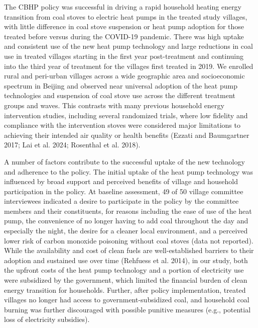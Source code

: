 \documentclass[
  letterpaper,
  DIV=11,
  numbers=noendperiod]{scrartcl}
\providecommand{\DIFadd}[1]{{\protect\color{blue}\uwave{#1}}} %
\providecommand{\DIFaddbegin}{} %
\providecommand{\DIFaddend}{} %
\providecommand{\DIFdelbegin}{} %
\providecommand{\DIFdelend}{} %
\newcommand{\DIFscaledelfig}{0.5}
\newlength{\DIFdelgraphicswidth} %
\newlength{\DIFdelgraphicsheight} %
\newcommand{\DIFaddincludegraphics}[2][]{{\color{blue}\fbox{\DIFOincludegraphics[#1]{#2}}}} %
\newcommand{\DIFdelincludegraphics}[2][]{%
\sbox{\DIFdelgraphicsbox}{\DIFOincludegraphics[#1]{#2}}%
\settoboxwidth{\DIFdelgraphicswidth}{\DIFdelgraphicsbox} %
\settoboxtotalheight{\DIFdelgraphicsheight}{\DIFdelgraphicsbox} %
\scalebox{\DIFscaledelfig}{%
\parbox[b]{\DIFdelgraphicswidth}{\usebox{\DIFdelgraphicsbox}\\[-\baselineskip] \rule{\DIFdelgraphicswidth}{0em}}\llap{\resizebox{\DIFdelgraphicswidth}{\DIFdelgraphicsheight}{%
\setlength{\unitlength}{\DIFdelgraphicswidth}%
\begin{picture}(1,1)%
\thicklines\linethickness{2pt} %
{\color[rgb]{1,0,0}\put(0,0){\framebox(1,1){}}}%
{\color[rgb]{1,0,0}\put(0,0){\line( 1,1){1}}}%
{\color[rgb]{1,0,0}\put(0,1){\line(1,-1){1}}}%
\end{picture}%
}\hspace*{3pt}}} %
} %
\DeclareRobustCommand{\DIFaddbegin}{\DIFOaddbegin \let\includegraphics\DIFaddincludegraphics} %
\DeclareRobustCommand{\DIFaddend}{\DIFOaddend \let\includegraphics\DIFOincludegraphics} %
\DeclareRobustCommand{\DIFdelbegin}{\DIFOdelbegin \let\includegraphics\DIFdelincludegraphics} %
\DeclareRobustCommand{\DIFdelend}{\DIFOaddend \let\includegraphics\DIFOincludegraphics} %
\begin{document}
The CBHP policy was successful in driving a rapid household heating
energy transition from coal stoves to electric heat pumps in the treated
study villages, with little difference in coal stove suspension or heat
pump adoption for those treated before versus during the COVID-19
pandemic. There was high uptake and consistent use of the new heat pump
technology and large reductions in coal use in treated villages starting
in the first year post-treatment and continuing into the third year of
treatment for the villages first treated in 2019. We enrolled rural and
peri-urban villages across a wide geographic area and socioeconomic
spectrum in Beijing and observed near universal adoption of the heat
pump technologies and suspension of coal stove use across the different
treatment groups and waves. This contrasts with many previous household
energy intervention studies, including several randomized trials, where
low fidelity and compliance with the intervention stoves were considered
major limitations to achieving their intended air quality or health
benefits (Ezzati and Baumgartner 2017; Lai et al. 2024; Rosenthal et al.
2018).

A number of factors contribute to the successful uptake of the new
technology and adherence to the policy. The initial uptake of the heat
pump technology was influenced by broad support and perceived benefits
of village and household participation in the policy. At baseline
assessment, 49 of 50 village committee interviewees indicated a desire
to participate in the policy by the committee members and their
constituents, for reasons including the ease of use of the heat pump,
the convenience of no longer having to add coal throughout the day and
especially the night, the desire for a cleaner local environment, and a
perceived lower risk of carbon monoxide poisoning without coal stoves
(data not reported). While the availability and cost of clean fuels are
well-established barriers to their adoption and sustained use over time
(Rehfuess et al. 2014), in our study, both the upfront costs of the heat
pump technology and a portion of electricity use were subsidized by the
government, which limited the financial burden of clean energy
transition for households. Further, after policy implementation, treated
villages no longer had access to government-subsidized coal, and
household coal burning was further discouraged with possible punitive
measures (e.g., potential loss of electricity subsidies).

\DIFdelbegin %
\DIFdelend \DIFaddbegin \subsection{\DIFadd{Impacts of the policy on
health}}\label{impacts-of-the-policy-on-health}
\DIFaddend 
\end{document}
